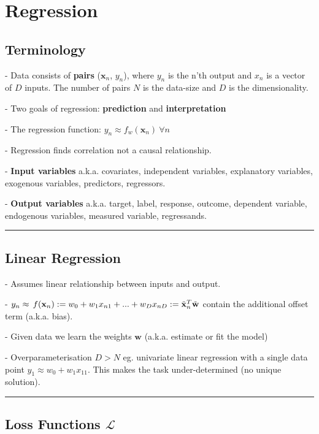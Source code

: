 
\section{Regression}
\subsection{Terminology}

- Data consists of \textbf{pairs} ($\mathbf{x}_n$, $y_n$), where $y_n$ is the n’th output and $x_n$ is a vector of $D$ inputs. The number of pairs $N$ is the data-size and $D$ is the dimensionality.

- Two goals of regression: \textbf{prediction} and \textbf{interpretation}

- The regression function: $y_{n}\approx f_w(\mathbf{x}_{n})\ \forall n$

- Regression finds correlation not a causal relationship.

- \textbf{Input variables} a.k.a. covariates, independent variables, explanatory variables, exogenous variables, predictors, regressors. 

- \textbf{Output variables} a.k.a. target, label, response, outcome, dependent variable, endogenous variables, measured variable, regressands.

\vspace{4pt}
\hrule
\vspace{4pt}
\subsection{Linear Regression}

- Assumes linear relationship between inputs and output.

- $y_{n}\approx\,f(\mathbf{x}_{n}) :=w_{0}+w_{1}x_{n1}+ ... +w_{D}x_{n D} \\ := \tilde{\bf x}_{n}^{T} \tilde{\bf w}$ contain the additional offset term (\small{a.k.a. bias}).

- Given data we learn the weights $\mathbf{w}$ (\small{a.k.a. estimate or fit the model})

- Overparameterisation $D > N$ eg. univariate linear regression with a single data point $y_{1}\approx w_{0}+w_{1}x_{11}$. This makes the task under-determined (no unique solution).

\vspace{4pt}
\hrule
\vspace{4pt}
\subsection{Loss Functions $\mathcal{L}$}

